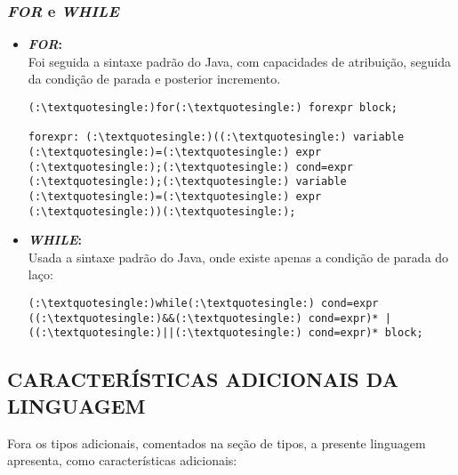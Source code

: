         \subsubsection{\normalsize \textit{FOR} e \textit{WHILE}}
        		\begin{itemize}
        			\item \textbf{\textit{FOR}:}\\
        				Foi seguida a sintaxe padrão do Java, com capacidades de atribuição, seguida da condição de parada e posterior incremento.
        				
        				\begin{lstlisting}
(:\textquotesingle:)for(:\textquotesingle:) forexpr block;

forexpr: (:\textquotesingle:)((:\textquotesingle:) variable (:\textquotesingle:)=(:\textquotesingle:) expr (:\textquotesingle:);(:\textquotesingle:) cond=expr (:\textquotesingle:);(:\textquotesingle:) variable (:\textquotesingle:)=(:\textquotesingle:) expr (:\textquotesingle:))(:\textquotesingle:);
        				\end{lstlisting}
        				
        			\item \textbf{\textit{WHILE}:}\\
        				Usada a sintaxe padrão do Java, onde existe apenas a condição de parada do laço:
        				\begin{lstlisting}
(:\textquotesingle:)while(:\textquotesingle:) cond=expr ((:\textquotesingle:)&&(:\textquotesingle:) cond=expr)* | ((:\textquotesingle:)||(:\textquotesingle:) cond=expr)* block;
        				\end{lstlisting}
        		\end{itemize}

	\subsection{\normalsize CARACTERÍSTICAS ADICIONAIS DA LINGUAGEM}
            Fora os tipos adicionais, comentados na seção de tipos, a presente linguagem apresenta, como características adicionais:
			
